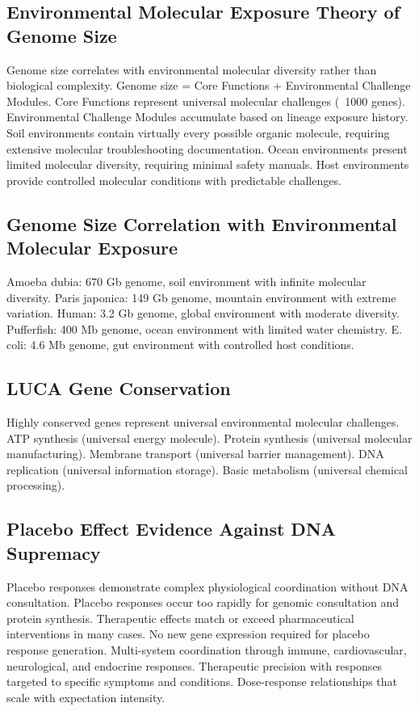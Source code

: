 \documentclass[12pt,a4paper]{article}
\begin{document}
\subsection{Environmental Molecular Exposure Theory of Genome Size}

Genome size correlates with environmental molecular diversity rather than biological complexity. Genome size = Core Functions + Environmental Challenge Modules. Core Functions represent universal molecular challenges (~1000 genes). Environmental Challenge Modules accumulate based on lineage exposure history. Soil environments contain virtually every possible organic molecule, requiring extensive molecular troubleshooting documentation. Ocean environments present limited molecular diversity, requiring minimal safety manuals. Host environments provide controlled molecular conditions with predictable challenges.

\subsection{Genome Size Correlation with Environmental Molecular Exposure}

Amoeba dubia: 670 Gb genome, soil environment with infinite molecular diversity. Paris japonica: 149 Gb genome, mountain environment with extreme variation. Human: 3.2 Gb genome, global environment with moderate diversity. Pufferfish: 400 Mb genome, ocean environment with limited water chemistry. E. coli: 4.6 Mb genome, gut environment with controlled host conditions.

\subsection{LUCA Gene Conservation}

Highly conserved genes represent universal environmental molecular challenges. ATP synthesis (universal energy molecule). Protein synthesis (universal molecular manufacturing). Membrane transport (universal barrier management). DNA replication (universal information storage). Basic metabolism (universal chemical processing).

\subsection{Placebo Effect Evidence Against DNA Supremacy}

Placebo responses demonstrate complex physiological coordination without DNA consultation. Placebo responses occur too rapidly for genomic consultation and protein synthesis. Therapeutic effects match or exceed pharmaceutical interventions in many cases. No new gene expression required for placebo response generation. Multi-system coordination through immune, cardiovascular, neurological, and endocrine responses. Therapeutic precision with responses targeted to specific symptoms and conditions. Dose-response relationships that scale with expectation intensity.
\end{document}
